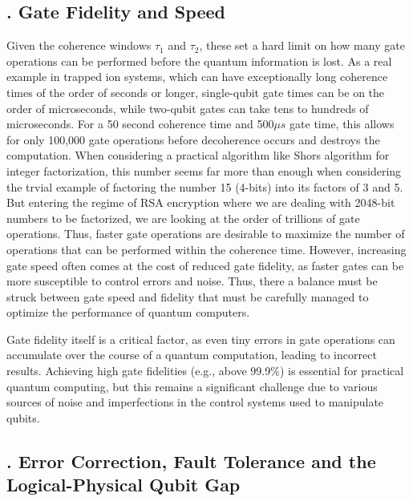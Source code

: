 \documentclass{elbioimp2}
\begin{document}
\subsection{. Gate Fidelity and Speed}
Given the coherence windows $\tau_1$ and $\tau_2$, these set a hard limit on how many gate operations can be performed before the quantum information is lost. As a real example in trapped ion systems, which can have exceptionally long coherence times of the order of seconds or longer, single-qubit gate times can be on the order of microseconds, while two-qubit gates can take tens to hundreds of microseconds. For a 50 second coherence time and 500$\mu s$ gate time, this allows for only 100,000 gate operations before decoherence occurs and destroys the computation. When considering a practical algorithm like Shors algorithm for integer factorization, this number seems far more than enough when considering the trvial example of factoring the number 15 (4-bits) into its factors of 3 and 5. But entering the regime of RSA encryption where we are dealing with 2048-bit numbers to be factorized, we are looking at the order of trillions of gate operations. Thus, faster gate operations are desirable to maximize the number of operations that can be performed within the coherence time. However, increasing gate speed often comes at the cost of reduced gate fidelity, as faster gates can be more susceptible to control errors and noise. Thus, there a balance must be struck between gate speed and fidelity that must be carefully managed to optimize the performance of quantum computers.

Gate fidelity itself is a critical factor, as even tiny errors in gate operations can accumulate over the course of a quantum computation, leading to incorrect results. Achieving high gate fidelities (e.g., above 99.9\%)\cite{99.9percent-required-fidelity} is essential for practical quantum computing, but this remains a significant challenge due to various sources of noise and imperfections in the control systems used to manipulate qubits.

\subsection{. Error Correction, Fault Tolerance and the Logical-Physical Qubit Gap}
\end{document}
